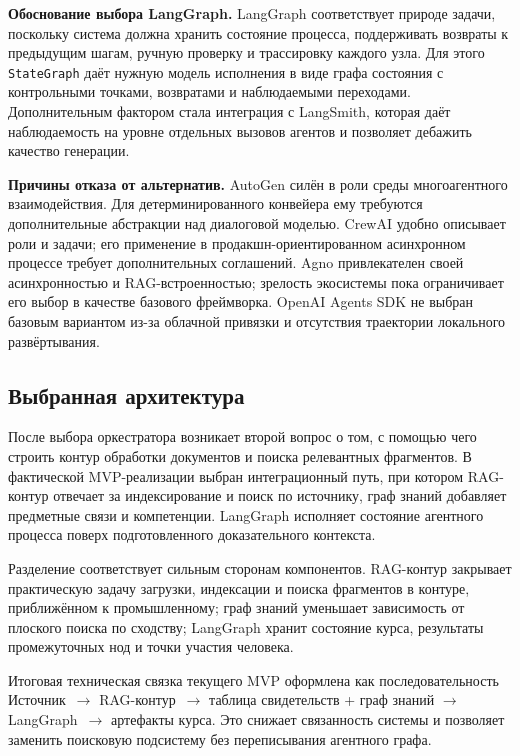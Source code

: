 \textbf{Обоснование выбора LangGraph.}
LangGraph соответствует природе задачи, поскольку система должна хранить
состояние процесса, поддерживать возвраты к предыдущим шагам,
ручную проверку и трассировку каждого узла. Для этого \texttt{StateGraph} даёт
нужную модель исполнения в виде графа состояния с контрольными точками,
возвратами и наблюдаемыми переходами. Дополнительным фактором стала интеграция
с LangSmith, которая даёт наблюдаемость на уровне отдельных вызовов
агентов и позволяет дебажить качество генерации.

\textbf{Причины отказа от альтернатив.}
AutoGen силён в роли среды многоагентного взаимодействия. Для
детерминированного конвейера ему требуются дополнительные абстракции над
диалоговой моделью. CrewAI удобно описывает роли и задачи; его
применение в продакшн-ориентированном асинхронном процессе требует
дополнительных соглашений. Agno привлекателен своей асинхронностью и
RAG-встроенностью; зрелость экосистемы пока ограничивает его выбор
в качестве базового фреймворка. OpenAI Agents SDK не выбран
базовым вариантом из-за облачной привязки и отсутствия
траектории локального развёртывания.

\subsection{Выбранная архитектура}

После выбора оркестратора возникает второй вопрос о том, с помощью чего строить
контур обработки документов и поиска релевантных фрагментов.
В фактической MVP-реализации выбран интеграционный путь, при котором
RAG-контур отвечает за индексирование и поиск по источнику,
граф знаний добавляет предметные связи и компетенции. LangGraph
исполняет состояние агентного процесса поверх подготовленного
доказательного контекста.

Разделение соответствует сильным сторонам компонентов. RAG-контур
закрывает практическую задачу загрузки, индексации и поиска фрагментов
в контуре, приближённом к промышленному; граф знаний уменьшает зависимость от
плоского поиска по сходству; LangGraph хранит состояние курса, результаты
промежуточных нод и точки участия человека.

Итоговая техническая связка текущего MVP оформлена как последовательность
Источник~$\rightarrow$ RAG-контур~$\rightarrow$ таблица свидетельств + граф знаний
$\rightarrow$ LangGraph~$\rightarrow$ артефакты курса. Это снижает связанность системы
и позволяет заменить поисковую подсистему без переписывания агентного графа.

